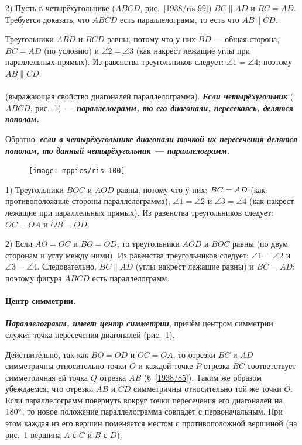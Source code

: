 \documentclass[oneside]{book}
\begin{document}
2) Пусть в четырёхугольнике ($ABCD$, рис.~\ref{1938/ris-99}) $BC\parallel AD$ и $BC = AD$.
Требуется доказать, что $ABCD$ есть параллелограмм, то есть что $AB \parallel CD$.

Треугольники $ABD$ и $BCD$ равны, потому что у них $BD$ — общая сторона, $BC = AD$ (по условию) и $\angle 2 = \angle 3$ (как накрест лежащие углы при параллельных прямых).
Из равенства треугольников следует:
$\angle 1 = \angle 4$;
поэтому $AB\parallel CD$.

\paragraph{}\label{1938/90}
 (выражающая свойство диагоналей параллелограмма).
\textbf{\emph{Если четырёхугольник}} ($ABCD$, рис.~\ref{1938/ris-100}) \textbf{\emph{— параллелограмм, то его диагонали, пересекаясь, делятся пополам.}}

Обратно:
\textbf{\emph{если в четырёхугольнике диагонали точкой их пересечения делятся пополам, то данный четырёхугольник — параллелограмм.}}

{

\begin{figure}
\vskip-4mm
\centering
\texttt{[image: mppics/ris-100]}
\caption{}\label{1938/ris-100}
\end{figure}

1) Треугольники $BOC$ и $AOD$ равны, потому что у них:
$BC\z=AD$ (как противоположные стороны параллелограмма), $\angle 1 = \angle 2$ и $\angle 3 = \angle 4$ (как накрест лежащие при параллельных прямых).
Из равенства треугольников следует:
$OC=OA$ и $OB=OD$.


2) Если $AO=OC$ и $BO=OD$, то треугольники $AOD$ и $BOC$ равны (по двум сторонам и углу между ними).
Из равенства треугольников следует:
$\angle 1 = \angle 2$ и $\angle 3 = \angle 4$.
Следовательно, $BC \parallel AD$ (углы накрест лежащие равны) и $BC=AD$;
поэтому фигура $ABCD$ есть параллелограмм.

}

\paragraph{Центр симметрии.}\label{1938/91}
\textbf{\emph{Параллелограмм, имеет центр симметрии}}, причём центром симметрии служит точка пересечения диагоналей (рис.~\ref{1938/ris-100}).

Действительно, так как $BO=OD$ и $OC=OA$, то отрезки $BC$ и $AD$ симметричны относительно точки $O$ и каждой точке $P$ отрезка $BC$ соответствует симметричная ей точка $Q$ отрезка $AB$ (§~\ref{1938/85}).
Таким же образом убеждаемся, что отрезки $AB$ и $CD$ симметричны относительно той же точки $O$.
Если параллелограмм повернуть вокруг точки пересечения его диагоналей на $180\degree$, то новое положение параллелограмма совпадёт с первоначальным.
При этом каждая из его вершин поменяется местом с противоположной вершиной 
(на рис.~\ref{1938/ris-100} вершина $A$ с $C$ и $B$ с $D$).
\end{document}
